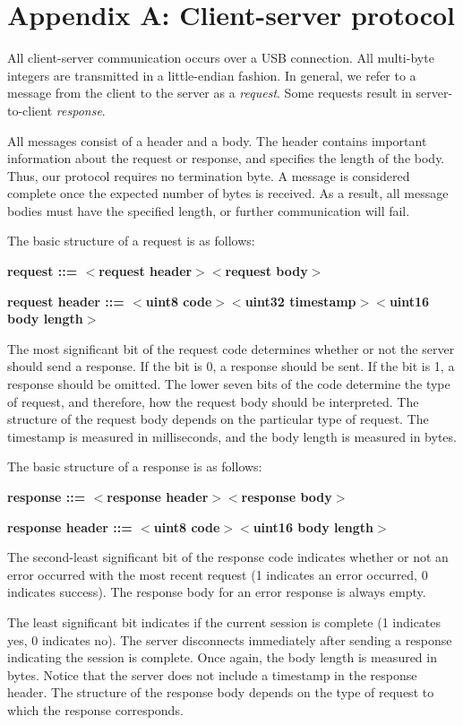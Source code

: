 \documentclass[12pt]{article}
\begin{document}
\newpage

\section{Appendix A: Client-server protocol}
\label{sec:protocol}
All client-server communication occurs over a USB connection.  All multi-byte integers are transmitted in a little-endian fashion.  In general, we refer to a message from the client to the server as a \textit{request}.  Some requests result in server-to-client \textit{response}.

All messages consist of a header and a body.  The header contains important information about the request or response, and specifies the length of the body. Thus, our protocol requires no termination byte.  A message is considered complete once the expected number of bytes is received.  As a result, all message bodies must have the specified length, or further communication will fail.

The basic structure of a request is as follows:

\textbf{request ::= $<$request header$>$$<$request body$>$}

\textbf{request header ::= $<$uint8 code$>$$<$uint32 timestamp$>$$<$uint16 body length$>$}

\noindent The most significant bit of the request code determines whether or not the server should send a response.  If the bit is 0, a response should be sent.  If the bit is 1, a response should be omitted.  The lower seven bits of the code determine the type of request, and therefore, how the request body should be interpreted.  The structure of the request body depends on the particular type of request.  The timestamp is measured in milliseconds, and the body length is measured in bytes.

The basic structure of a response is as follows:

\textbf{response ::= $<$response header$>$$<$response body$>$}

\textbf{response header ::= $<$uint8 code$>$$<$uint16 body length$>$}

\noindent The second-least significant bit of the response code indicates whether or not an error occurred with the most recent request (1 indicates an error occurred, 0 indicates success).  The response body for an error response is always empty.

The least significant bit indicates if the current session is complete (1 indicates yes, 0 indicates no).  The server disconnects immediately after sending a response indicating the session is complete.  Once again, the body length is measured in bytes.  Notice that the server does not include a timestamp in the response header.  The structure of the response body depends on the type of request to which the response corresponds.
\end{document}
